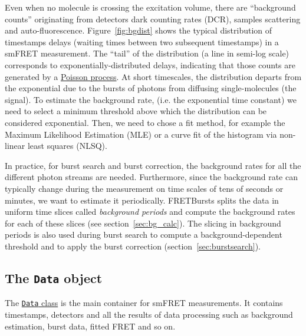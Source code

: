 Even when no molecule is crossing the excitation volume, there are “background counts” originating from detectors dark counting rates (DCR), samples scattering and auto-fluorescence. Figure~\ref{fig:bgdist} shows the typical distribution of timestamps delays (waiting times between two subsequent timestamps) in a smFRET measurement. The “tail” of the distribution (a line in semi-log scale) corresponds to exponentially-distributed delays, indicating that those counts are generated by a \href{http://en.wikipedia.org/wiki/Poisson_process}{Poisson process}. At short timescales, the distribution departs from the exponential due to the bursts of photons from diffusing single-molecules (the signal). To estimate the background rate, (i.e. the exponential time constant) we need to select a minimum threshold above which the distribution can be considered exponential. Then, we need to chose a fit method, for example the Maximum Likelihood Estimation (MLE) or a curve fit of the histogram via non-linear least squares (NLSQ).

In practice, for burst search and burst correction, the background rates for all the different photon streams are needed. Furthermore, since the background rate can typically change during the measurement on time scales of tens of seconds or minutes, we want to estimate it periodically. FRETBursts splits the data in uniform time slices called \textit{background periods} and compute the background rates for each of these slices (see section~\ref{sec:bg_calc}). The slicing in background periods is also used during burst search to compute a background-dependent threshold and to apply the burst correction (section~\ref{sec:burstsearch}).

\subsection{The \texttt{Data} object}
\label{sec:data_intro}

The \href{http://fretbursts.readthedocs.org/en/latest/data_class.html}{\texttt{Data} class} is the main container for smFRET measurements. It contains timestamps, detectors and all the results of data processing such as background estimation, burst data, fitted FRET and so on.

